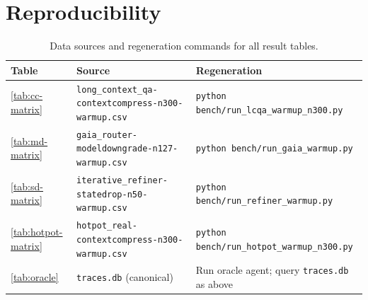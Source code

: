 


\printAffiliationsAndNotice{}
\appendix
\section{Reproducibility}
\label{sec:repro}

\begin{table}[t]
\caption{Data sources and regeneration commands for all result tables.}
\label{tab:repro}
\small
\begin{tabularx}{\linewidth}{p{1.7cm} >{\raggedright\arraybackslash}X >{\raggedright\arraybackslash}X}
\toprule
Table & Source & Regeneration \\
\midrule

\ref{tab:cc-matrix} &
\texttt{long\_\allowbreak context\_\allowbreak qa-\allowbreak contextcompress-\allowbreak n300-\allowbreak warmup.csv} &
\texttt{python bench/run\_\allowbreak lcqa\_\allowbreak warmup\_\allowbreak n300.py} \\

\addlinespace
\ref{tab:md-matrix} &
\texttt{gaia\_\allowbreak router-\allowbreak modeldowngrade-\allowbreak n127-\allowbreak warmup.csv} &
\texttt{python bench/run\_\allowbreak gaia\_\allowbreak warmup.py} \\

\addlinespace
\ref{tab:sd-matrix} &
\texttt{iterative\_\allowbreak refiner-\allowbreak statedrop-\allowbreak n50-\allowbreak warmup.csv} &
\texttt{python bench/run\_\allowbreak refiner\_\allowbreak warmup.py} \\

\addlinespace
\ref{tab:hotpot-matrix} &
\texttt{hotpot\_\allowbreak real-\allowbreak contextcompress-\allowbreak n300-\allowbreak warmup.csv} &
\texttt{python bench/run\_\allowbreak hotpot\_\allowbreak warmup\_\allowbreak n300.py} \\

\addlinespace
\ref{tab:oracle} &
\texttt{traces.db} (canonical) &
Run oracle agent; query \texttt{traces.db} as above \\


\end{tabularx}
\end{table}
